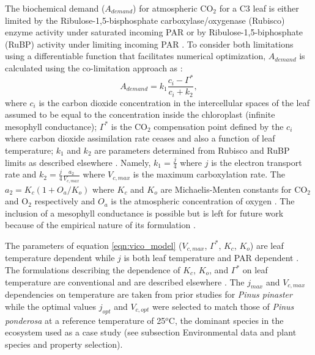 \documentclass[utf8]{frontiersSCNS} %
\begin{document}
The biochemical demand ($A_{demand}$) for atmospheric CO$_2$ for a C3 leaf is either limited by the Ribulose-1,5-bisphosphate carboxylase/oxygenase (Rubisco) enzyme activity under saturated incoming PAR or by Ribulose-1,5-biphosphate (RuBP) activity under limiting incoming PAR \citep{farquhar_biochemical_1980}. To consider both limitations using a differentiable function that facilitates numerical optimization, $A_{demand}$ is calculated using the co-limitation approach as \citep{vico_perspective_2013}:
\begin{equation}
    \label{eqn:vico_model}
    A_{demand} = k_1 \frac{c_i - \Gamma^*}{c_i + k_2},
\end{equation}
where $c_i$ is the carbon dioxide concentration in the intercellular spaces of the leaf assumed to be equal to the concentration inside the chloroplast (infinite mesophyll conductance); $\Gamma^*$ is the CO$_2$ compensation point defined by the $c_i$ where carbon dioxide assimilation rate ceases and also a function of leaf temperature; $k_1$ and $k_2$ are parameters determined from Rubisco and RuBP limits as described elsewhere \citep{vico_perspective_2013}. Namely, $k_1 = \frac{j}{4}$ where $j$ is the electron transport rate and $k_2 = \frac{j}{4} \frac{a_2}{V_{c,max}}$ where $V_{c,max}$ is the maximum carboxylation rate. The $a_2 = K_c (1+O_a/K_o)$ where $K_c$ and $K_o$ are Michaelis-Menten constants for CO$_2$ and O$_2$ respectively and $O_a$ is the atmospheric concentration of oxygen \citep{bernacchi_improved_2001}. The inclusion of a mesophyll conductance is possible but is left for future work because of the empirical nature of its formulation \citep{dewar2018new}.


The parameters of equation \ref{eqn:vico_model} ($V_{c,max}$, $\Gamma^*$, $K_c$, $K_o$) are leaf temperature dependent while $j$ is both leaf temperature and PAR dependent \citep{medlyn_temperature_2002}. The formulations describing the dependence of $K_c$, $K_o$, and $\Gamma^*$ on leaf temperature are conventional and are described elsewhere \citep{bernacchi_improved_2001}. The $j_{max}$ and $V_{c,max}$ dependencies on temperature are taken from prior studies for \textit{Pinus pinaster} \citep{medlyn_temperature_2002} while the optimal values $j_{opt}$ and $V_{c,opt}$ were selected to match those of \textit{Pinus ponderosa} at a reference temperature of 25$^o$C, the dominant species in the ecosystem used as a case study (see subsection Environmental data and plant species and property selection).
\end{document}
